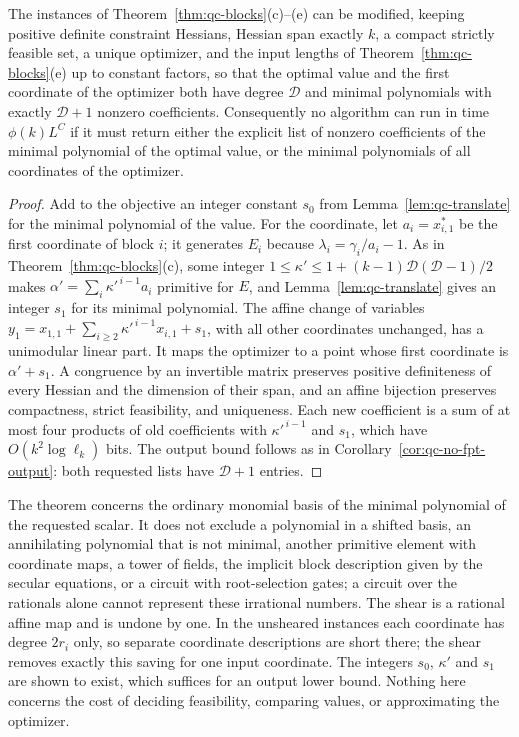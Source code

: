 \begin{theorem}
\label{thm:qc-sparse}
The instances of Theorem~\ref{thm:qc-blocks}(c)--(e) can be modified, keeping
positive definite constraint Hessians, Hessian span exactly $k$, a compact
strictly feasible set, a unique optimizer, and the input lengths of
Theorem~\ref{thm:qc-blocks}(e) up to constant factors, so that the optimal
value and the first
coordinate of the optimizer both have degree $\mathcal D$ and minimal
polynomials with exactly $\mathcal D+1$ nonzero coefficients. Consequently no
algorithm can run in time $\phi(k)L^C$ if it must return either the explicit
list of nonzero coefficients of the minimal polynomial of the optimal value,
or the minimal polynomials of all coordinates of the optimizer.
\end{theorem}

\begin{proof}
Add to the objective an integer constant $s_0$ from
Lemma~\ref{lem:qc-translate} for the minimal polynomial of the value. For the
coordinate, let $a_i=x_{i,1}^*$ be the first coordinate of block $i$; it
generates $E_i$ because $\lambda_i=\gamma_i/a_i-1$. As in
Theorem~\ref{thm:qc-blocks}(c), some integer
$1\le\kappa'\le1+(k-1)\mathcal D(\mathcal D-1)/2$ makes
$\alpha'=\sum_i\kappa'^{\,i-1}a_i$ primitive for $E$, and
Lemma~\ref{lem:qc-translate} gives an integer $s_1$ for its minimal
polynomial. The affine change of variables
$y_1=x_{1,1}+\sum_{i\ge2}\kappa'^{\,i-1}x_{i,1}+s_1$, with all other
coordinates unchanged, has a unimodular linear part. It maps the optimizer to
a point whose first coordinate is $\alpha'+s_1$. A congruence by an invertible
matrix preserves positive definiteness of every Hessian and the dimension of
their span, and an affine bijection preserves compactness, strict
feasibility, and uniqueness. Each new coefficient is a sum of at most four
products of old coefficients with $\kappa'^{\,i-1}$ and $s_1$, which have
$O(k^2\log\ell_k)$ bits. The output bound follows as in
Corollary~\ref{cor:qc-no-fpt-output}: both requested lists have
$\mathcal D+1$ entries.
\end{proof}

The theorem concerns the ordinary monomial basis of the minimal polynomial of
the requested scalar. It does not exclude a polynomial in a shifted basis, an
annihilating polynomial that is not minimal, another primitive element with
coordinate maps, a tower of fields, the implicit block description given by
the secular equations, or a circuit with root-selection gates; a circuit over
the rationals alone cannot represent these irrational numbers. The shear is a
rational affine map and is undone by one. In the unsheared instances each
coordinate has degree $2r_i$ only, so separate coordinate descriptions are
short there; the shear removes exactly this saving for one input
coordinate. The integers $s_0$, $\kappa'$ and $s_1$ are
shown to exist, which suffices for an output lower bound. Nothing here
concerns the cost of deciding feasibility, comparing values, or approximating
the optimizer.

